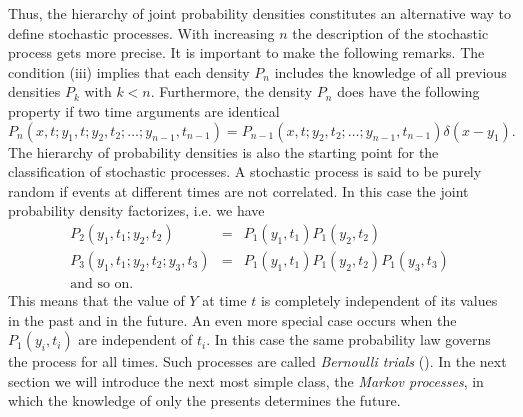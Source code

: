 Thus, the hierarchy of joint probability densities constitutes an 
alternative way to define stochastic processes. 
With increasing $n$ the description of the stochastic process gets
more precise. It is important to 
make the following remarks.  The condition (iii) implies that each 
density $P_n$ includes the knowledge of all previous densities
$P_k$ with $k<n$. Furthermore, the density $P_n$ does have the 
following property if two time arguments are identical
\begin{equation*}
P_n(x,t;y_1,t;y_2,t_2; \ldots ; y_{n-1},t_{n-1}) = 
P_{n-1}(x,t;y_2,t_2; \ldots ; y_{n-1},t_{n-1})
\delta(x-y_1).
\end{equation*}
The hierarchy of probability densities is also the starting point 
for the classification of stochastic processes. A stochastic 
process is said to be purely random if events at different times 
are not correlated. In this case the joint probability density 
factorizes, i.e. we have
\begin{eqnarray*}
P_2(y_1,t_1;y_2,t_2) &=& P_1(y_1,t_1) P_1(y_2,t_2) \\
P_3(y_1,t_1;y_2,t_2;y_3,t_3) &=& P_1(y_1,t_1) P_1(y_2,t_2)P_1(y_3,t_3) 
\\
\text{and so on.} &&
\end{eqnarray*}
This means that the value of $Y$ at time $t$ is completely 
independent of its values in the past and in the future. An even
more special case occurs when the $P_1(y_i,t_i)$ are independent 
of $t_i$. In this case the same probability law governs the 
process for all times. Such processes are called
{\em Bernoulli trials} (\cite{GARDINER}). In the next section we 
will introduce the next most simple class, the {\em Markov processes},
in which the knowledge of only the presents determines the future.



